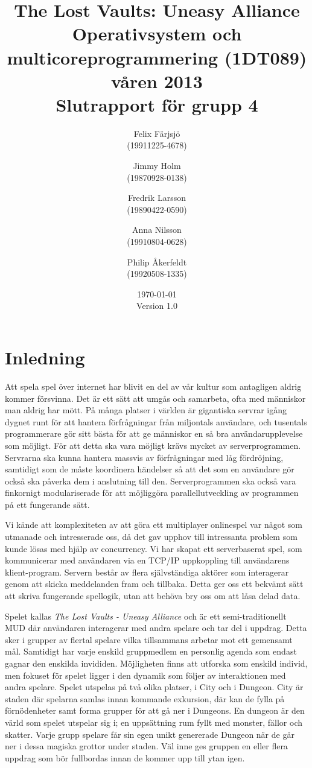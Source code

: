 \documentclass[a4paper]{article}
\title{The Lost Vaults: Uneasy Alliance\\\small{Operativsystem och multicoreprogrammering (1DT089) våren 2013}\\\small{Slutrapport för grupp 4}}
\author{Felix Färjsjö\\(19911225-4678) \and Jimmy Holm\\(19870928-0138) \and Fredrik Larsson\\(19890422-0590) \and Anna Nilsson\\(19910804-0628) \and Philip Åkerfeldt\\(19920508-1335)}
\date{\today\\Version 1.0}
\begin{document}
\maketitle
\thispagestyle{empty}
\newpage
\setcounter{page}{1}
\tableofcontents
\listoffigures
\newpage
\setcounter{page}{1}
\section{Inledning}
Att spela spel över internet har blivit en del av vår kultur som antagligen aldrig kommer försvinna. Det är ett sätt att umgås och samarbeta, ofta med människor man aldrig har mött. 
På många platser i världen är gigantiska servrar igång dygnet runt för att hantera förfrågningar från miljontals användare, och tusentals programmerare gör sitt bästa för 
att ge människor en så bra användarupplevelse som möjligt. 
För att detta ska vara möjligt krävs mycket av serverprogrammen. 
Servrarna ska kunna hantera massvis av förfrågningar med låg fördröjning, samtidigt som de måste koordinera händelser så att det som en användare gör också ska påverka dem i anslutning till den. 
Serverprogrammen ska också vara finkornigt modulariserade för att möjliggöra parallellutveckling av programmen på ett fungerande sätt.  
 
Vi kände att komplexiteten av att göra ett multiplayer onlinespel var något som utmanade och intresserade oss, då det gav upphov till intressanta problem som kunde lösas med hjälp av concurrency. 
Vi har skapat ett serverbaserat spel, som kommunicerar med användaren via en TCP/IP uppkoppling till användarens klient-program. Servern består av flera självständiga aktörer som interagerar
genom att skicka meddelanden fram och tillbaka. Detta ger oss ett bekvämt sätt att skriva fungerande spellogik, utan att behöva bry oss om att låsa delad data.

Spelet kallas \textit{The Lost Vaults - Uneasy Alliance} och är ett semi-traditionellt MUD där användaren interagerar med andra spelare och tar del i uppdrag. 
Detta sker i grupper av flertal spelare vilka tillsammans arbetar mot ett gemensamt mål. Samtidigt har varje enskild gruppmedlem en personlig agenda som endast 
gagnar den enskilda invididen. Möjligheten finns att utforska som enskild individ, men fokuset för spelet ligger i den dynamik som följer av 
interaktionen med andra spelare. Spelet utspelas på två olika platser, i City och i Dungeon. City är staden där spelarna samlas innan kommande exkursion, där kan de fylla på förnödenheter samt forma grupper för att gå ner i Dungeons. En dungeon är den värld som spelet utspelar sig i; en uppsättning rum fyllt med monster, fällor och skatter. 
Varje grupp spelare får sin egen unikt genererade Dungeon när de går ner i dessa magiska grottor under staden. Väl inne ges gruppen en eller flera uppdrag som bör fullbordas innan de kommer upp till ytan igen.
\end{document}
